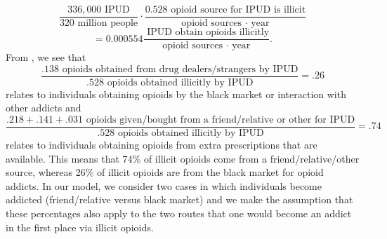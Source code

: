 \documentclass[12pt]{article}
\begin{document}
$$\frac{336,000\text { IPUD}}{320 \text{ million people}}\cdot \frac{0.528 \text{ opioid source for IPUD is illicit}}{\text{opioid sources $\cdot$ year}}$$
$$=0.000554 \frac{ \text { IPUD obtain opioids illicitly}}{{\text{opioid sources $\cdot$ year}}}.$$
From \cite{Han}, we see that \\
$$\frac{.138 \text{ opioids obtained from drug dealers/strangers by IPUD}}{.528 \text{ opioids obtained illicitly by IPUD}}=.26$$ 
relates to individuals obtaining opioids by the black market or interaction with other addicts and
$$\frac{.218+.141+.031 \text{ opioids given/bought from a friend/relative or other for IPUD}}{.528 \text{ opioids obtained illicitly by IPUD}}=.74$$ 
relates to individuals obtaining opioids from extra prescriptions that are available. This means that 74\% of illicit opioids come from a friend/relative/other source, whereas 26\% of illicit opioids are from the black market for opioid addicts. In our model, we consider two cases in which individuals become addicted (friend/relative versus black market) and we make the assumption that these percentages also apply to the two routes that one would become an addict in the first place via illicit opioids. 
\end{document}
